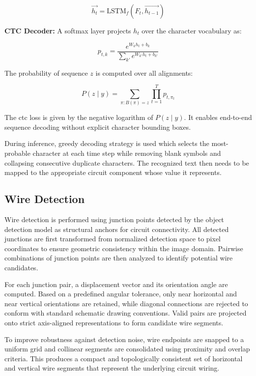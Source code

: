 \begin{equation}
\overrightarrow{h_t} = \text{LSTM}_f(F_t, \overrightarrow{h_{t-1}})
\label{eq:bilstm}
\end{equation}

\textbf{CTC Decoder:} A softmax layer projects $h_t$ over the character vocabulary as:

\begin{equation}
p_{t,k} = \frac{e^{W_k h_t + b_k}}{\sum_{k'} e^{W_{k'} h_t + b_{k'}}}
\label{eq:ctc-softmax}
\end{equation}

The probability of sequence $z$ is computed over all alignments:

\begin{equation}
P(z \mid y) = \sum_{\pi: B(\pi)=z} \prod_{t=1}^{T} p_{t,\pi_t}
\label{eq:ctc-probability}
\end{equation}

The \gls{ctc} loss is given by the negative logarithm of $P(z \mid y)$. It enables end-to-end sequence decoding without explicit character bounding boxes.

During inference, greedy decoding strategy is used which selects the most-probable character at each time step while removing blank symbols and collapsing consecutive duplicate characters. The recognized text then needs to be mapped to the appropriate circuit component whose value it represents.

\subsection{Wire Detection}

Wire detection is performed using junction points detected by the object detection model as structural anchors for circuit connectivity. All detected junctions are first transformed from normalized detection space to pixel coordinates to ensure geometric consistency within the image domain. Pairwise combinations of junction points are then analyzed to identify potential wire candidates.

For each junction pair, a displacement vector and its orientation angle are computed. Based on a predefined angular tolerance, only near horizontal and near vertical orientations are retained, while diagonal connections are rejected to conform with standard schematic drawing conventions. Valid pairs are projected onto strict axis-aligned representations to form candidate wire segments.

To improve robustness against detection noise, wire endpoints are snapped to a uniform grid and collinear segments are consolidated using proximity and overlap criteria. This produces a compact and topologically consistent set of horizontal and vertical wire segments that represent the underlying circuit wiring.


